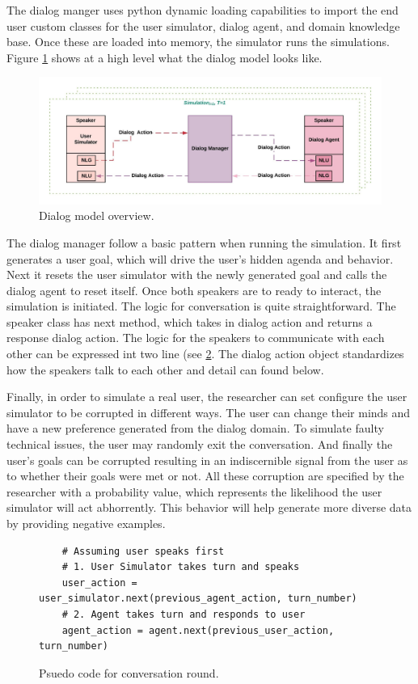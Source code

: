 The dialog manger uses python dynamic loading capabilities to import the end user custom classes for the user simulator, dialog agent, and domain knowledge base. Once these are loaded into memory, the simulator runs the simulations. Figure 
\ref{fig:dialog_model} shows at a high level what the dialog model looks like. 
\begin{figure}[h!]
	\includegraphics[width=\linewidth]{diagrams/dialog_model.jpeg}
	\caption{ Dialog model overview. }
	\label{fig:dialog_model}
\end{figure}

The dialog manager follow a basic pattern when running the simulation. It first generates a user goal, which will drive the user's hidden agenda and behavior. Next it resets the user simulator with the newly generated goal and calls the dialog agent to reset itself. Once both speakers are to ready to interact, the simulation is initiated. The logic for conversation is quite straightforward. The speaker class has next method, which takes in dialog action and returns a response dialog action. The logic for the speakers to communicate with each other can be expressed int two line (see \ref{fig:conv_round}. The dialog action object standardizes how the speakers talk to each other and detail can found below.  

Finally, in order to simulate a real user, the researcher can set configure the user simulator to be corrupted in different ways. The user can change their minds and have a new preference generated from the dialog domain. To simulate faulty technical issues, the user may randomly exit the conversation. And finally the user's goals can be corrupted resulting in an indiscernible signal from the user as to whether their goals were met or not. All these corruption are specified by the researcher with a probability value, which represents the likelihood the user simulator will  act abhorrently. This behavior will 
help generate more diverse data  by providing negative examples.

\begin{figure}[h!]
	\label{fig:conv_round}
	\begin{lstlisting}
	# Assuming user speaks first 
	# 1. User Simulator takes turn and speaks
	user_action = user_simulator.next(previous_agent_action, turn_number)
	# 2. Agent takes turn and responds to user 
	agent_action = agent.next(previous_user_action, turn_number)
	\end{lstlisting}
	\caption{Psuedo code for conversation round.}
\end{figure}

